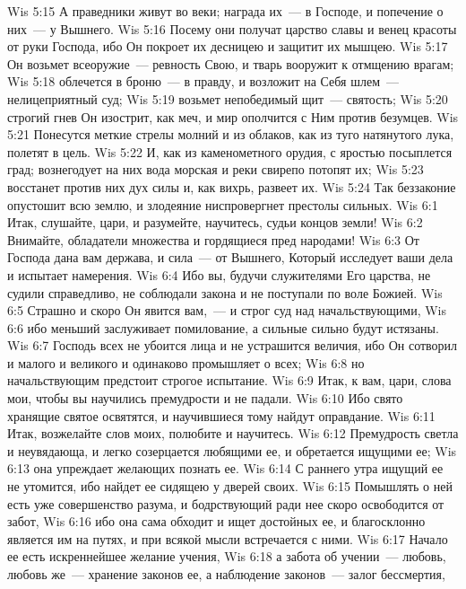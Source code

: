\vs Wis 5:15 А праведники живут во веки; награда их~--- в Господе, и попечение о них~--- у Вышнего.
\vs Wis 5:16 Посему они получат царство славы и венец красоты от руки Господа, ибо Он покроет их десницею и защитит их мышцею.
\vs Wis 5:17 Он возьмет всеоружие~--- ревность Свою, и тварь вооружит к отмщению врагам;
\vs Wis 5:18 облечется в броню~--- в правду, и возложит на Себя шлем~--- нелицеприятный суд;
\vs Wis 5:19 возьмет непобедимый щит~--- святость;
\vs Wis 5:20 строгий гнев Он изострит, как меч, и мир ополчится с Ним против безумцев.
\vs Wis 5:21 Понесутся меткие стрелы молний и из облаков, как из туго натянутого лука, полетят в цель.
\vs Wis 5:22 И, как из каменометного орудия, с яростью посыплется град; вознегодует на них вода морская и реки свирепо потопят их;
\vs Wis 5:23 восстанет против них дух силы и, как вихрь, развеет их.
\vs Wis 5:24 Так беззаконие опустошит всю землю, и злодеяние ниспровергнет престолы сильных.
\vs Wis 6:1 Итак, слушайте, цари, и разумейте, научитесь, судьи концов земли!
\vs Wis 6:2 Внимайте, обладатели множества и гордящиеся пред народами!
\vs Wis 6:3 От Господа дана вам держава, и сила~--- от Вышнего, Который исследует ваши дела и испытает намерения.
\vs Wis 6:4 Ибо вы, будучи служителями Его царства, не судили справедливо, не соблюдали закона и не поступали по воле Божией.
\vs Wis 6:5 Страшно и скоро Он явится вам,~--- и строг суд над начальствующими,
\vs Wis 6:6 ибо меньший заслуживает помилование, а сильные сильно будут истязаны.
\vs Wis 6:7 Господь всех не убоится лица и не устрашится величия, ибо Он сотворил и малого и великого и одинаково промышляет о всех;
\vs Wis 6:8 но начальствующим предстоит строгое испытание.
\vs Wis 6:9 Итак, к вам, цари, слова мои, чтобы вы научились премудрости и не падали.
\vs Wis 6:10 Ибо свято хранящие святое освятятся, и научившиеся тому найдут оправдание.
\vs Wis 6:11 Итак, возжелайте слов моих, полюбите и научитесь.
\vs Wis 6:12 Премудрость светла и неувядающа, и легко созерцается любящими ее, и обретается ищущими ее;
\vs Wis 6:13 она  упреждает желающих познать ее.
\vs Wis 6:14 С раннего утра ищущий ее не утомится, ибо найдет ее сидящею у дверей своих.
\vs Wis 6:15 Помышлять о ней есть уже совершенство разума, и бодрствующий ради нее скоро освободится от забот,
\vs Wis 6:16 ибо она сама обходит и ищет достойных ее, и благосклонно является им на путях, и при всякой мысли встречается с ними.
\vs Wis 6:17 Начало ее есть искреннейшее желание учения,
\vs Wis 6:18 а забота об учении~--- любовь, любовь же~--- хранение законов ее, а наблюдение законов~--- залог бессмертия,
